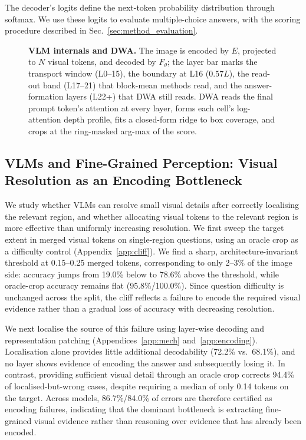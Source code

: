 \documentclass{article} %
\begin{document}
The decoder's logits define the next-token probability distribution
through softmax. We use these logits to evaluate multiple-choice answers,
with the scoring procedure described in Sec.~\ref{sec:method_evaluation}.

\begin{figure}[t]
\centering
\resizebox{\linewidth}{!}{}
\caption{\textbf{VLM internals and DWA.} The image is encoded by $E$, projected to $N$ visual tokens, and decoded by $F_\theta$; the layer bar marks the transport window (L0--15), the boundary at L16 ($0.57L$), the read-out band (L17--21) that block-mean methods read, and the answer-formation layers (L22+) that DWA still reads. DWA reads the final prompt token's attention at every layer, forms each cell's log-attention depth profile, fits a closed-form ridge to box coverage, and crops at the ring-masked arg-max of the score.}
\label{fig:vlm_dwa}
\end{figure}

\subsection{VLMs and Fine-Grained Perception: Visual Resolution as an Encoding Bottleneck}\label{sec:cliff}

We study whether VLMs can resolve small visual details after correctly localising the relevant region, and whether allocating visual tokens to the relevant region is more effective than uniformly increasing resolution. We first sweep the target extent in merged visual tokens on single-region questions, using an oracle crop as a difficulty control (Appendix~\ref{app:cliff}). We find a sharp, architecture-invariant threshold at 0.15--0.25 merged tokens, corresponding to only 2--3\% of the image side: accuracy jumps from 19.0\% below to 78.6\% above the threshold, while oracle-crop accuracy remains flat (95.8\%/100.0\%). Since question difficulty is unchanged across the split, the cliff reflects a failure to encode the required visual evidence rather than a gradual loss of accuracy with decreasing resolution.

We next localise the source of this failure using layer-wise decoding and representation patching (Appendices~\ref{app:mech} and~\ref{app:encoding}). Localisation alone provides little additional decodability (72.2\% vs.\ 68.1\%), and no layer shows evidence of encoding the answer and subsequently losing it. In contrast, providing sufficient visual detail through an oracle crop corrects 94.4\% of localised-but-wrong cases, despite requiring a median of only 0.14 tokens on the target. Across models, 86.7\%/84.0\% of errors are therefore certified as encoding failures, indicating that the dominant bottleneck is extracting fine-grained visual evidence rather than reasoning over evidence that has already been encoded.
\end{document}
